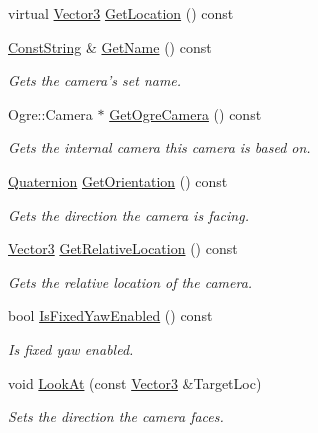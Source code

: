 \begin{DoxyCompactItemize}
virtual \hyperlink{classphys_1_1Vector3}{Vector3} \hyperlink{classphys_1_1Camera_a75b3f25ff664c4f95f0e04cb9edceeb4}{GetLocation} () const 
\item 
\hyperlink{namespacephys_a5ce5049f8b4bf88d6413c47b504ebb31}{ConstString} \& \hyperlink{classphys_1_1Camera_ae24490b8589796cb5f51d291cc418d84}{GetName} () const 
\begin{DoxyCompactList}\small\item\em Gets the camera's set name. \item\end{DoxyCompactList}\item 
Ogre::Camera $\ast$ \hyperlink{classphys_1_1Camera_a4f78f7a62580fa538d5bf2cb361644b2}{GetOgreCamera} () const 
\begin{DoxyCompactList}\small\item\em Gets the internal camera this camera is based on. \item\end{DoxyCompactList}\item 
\hyperlink{classphys_1_1Quaternion}{Quaternion} \hyperlink{classphys_1_1Camera_a48e0b33e0f12247bc0a0e0d6f759683e}{GetOrientation} () const 
\begin{DoxyCompactList}\small\item\em Gets the direction the camera is facing. \item\end{DoxyCompactList}\item 
\hyperlink{classphys_1_1Vector3}{Vector3} \hyperlink{classphys_1_1Camera_ae3dc70090e83e19a9c5f6df302bb57a5}{GetRelativeLocation} () const 
\begin{DoxyCompactList}\small\item\em Gets the relative location of the camera. \item\end{DoxyCompactList}\item 
bool \hyperlink{classphys_1_1Camera_a9b0aa17df46c427ab531bd587bd76e0f}{IsFixedYawEnabled} () const 
\begin{DoxyCompactList}\small\item\em Is fixed yaw enabled. \item\end{DoxyCompactList}\item 
void \hyperlink{classphys_1_1Camera_a299de2281cc566df476b4684ac7d89fa}{LookAt} (const \hyperlink{classphys_1_1Vector3}{Vector3} \&TargetLoc)
\begin{DoxyCompactList}\small\item\em Sets the direction the camera faces. \item\end{DoxyCompactList}\item 

\end{DoxyCompactItemize}
